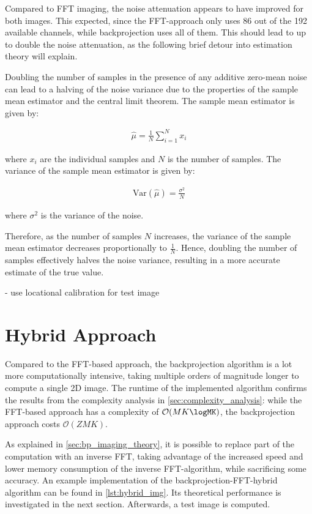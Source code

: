 Compared to FFT imaging, the noise attenuation appears to have improved for both images.
This expected, since the FFT-approach only uses 86 out of the 192 available channels,
while backprojection uses all of them.
This should lead to up to double the noise attenuation,
as the following brief detour into estimation theory will explain.

Doubling the number of samples in the presence of any additive zero-mean noise
can lead to a halving of the noise variance due to the properties of the sample mean estimator
and the central limit theorem. 
The sample mean estimator is given by:

\begin{align}
\hat{\mu} = \frac{1}{N} \sum_{i=1}^{N} x_i    
\end{align}

where $ x_i $ are the individual samples and $ N $ is the number of samples.
The variance of the sample mean estimator is given by:

\begin{align}
\text{Var}(\hat{\mu}) = \frac{\sigma^2}{N}    
\end{align}

where $ \sigma^2 $ is the variance of the noise.

Therefore, as the number of samples $ N $ increases,
the variance of the sample mean estimator decreases proportionally to $ \frac{1}{N}$.
Hence, doubling the number of samples effectively halves the noise variance,
resulting in a more accurate estimate of the true value.


- use locational calibration for test image

\section{Hybrid Approach}
\label{sec:hybrid_imaging}
Compared to the FFT-based approach, the backprojection algorithm is a lot more computationally intensive,
taking multiple orders of magnitude longer to compute a single 2D image.
The runtime of the implemented algorithm confirms the results from the complexity analysis in \autoref{sec:complexity_analysis}:
while the FFT-based approach has a complexity of $\mathcal O(MK\logMK)$, the backprojection approach costs $\mathcal O(ZMK)$.

As explained in \autoref{sec:bp_imaging_theory},
it is possible to replace part of the computation with an inverse FFT,
taking advantage of the increased speed and lower memory consumption of the inverse FFT-algorithm,
while sacrificing some accuracy.
An example implementation of the backprojection-FFT-hybrid algorithm can be found in \ref{lst:hybrid_img}.
Its theoretical performance is investigated in the next section. Afterwards, a test image is computed.

